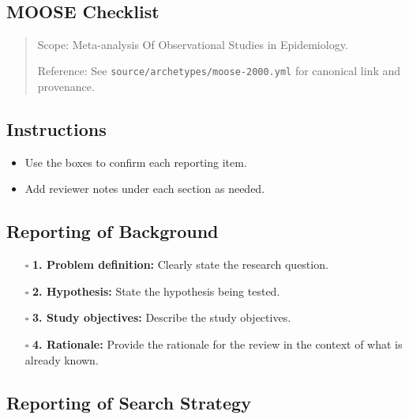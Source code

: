 \documentclass[11pt]{article}
\def\tightlist{}
\begin{document}
\begin{center}
{\LARGE }\\[4pt]
\normalsize 
\end{center}
\vspace{1em}

\begin{Form}

\section{MOOSE Checklist}\label{moose-checklist}

\begin{quote}
Scope: Meta-analysis Of Observational Studies in Epidemiology.

Reference: See \texttt{source/archetypes/moose-2000.yml} for canonical
link and provenance.
\end{quote}

\subsection{Instructions}\label{instructions}

\begin{itemize}
\tightlist
\item
  Use the boxes to confirm each reporting item.
\item
  Add reviewer notes under each section as needed.
\end{itemize}

\subsection{Reporting of Background}\label{reporting-of-background}

\begin{itemize}
\tightlist
\item[$\square$]
  \textbf{1. Problem definition:} Clearly state the research question.
\item[$\square$]
  \textbf{2. Hypothesis:} State the hypothesis being tested.
\item[$\square$]
  \textbf{3. Study objectives:} Describe the study objectives.
\item[$\square$]
  \textbf{4. Rationale:} Provide the rationale for the review in the
  context of what is already known.
\end{itemize}

\subsection{Reporting of Search
Strategy}\label{reporting-of-search-strategy}


\end{Form}
\end{document}
